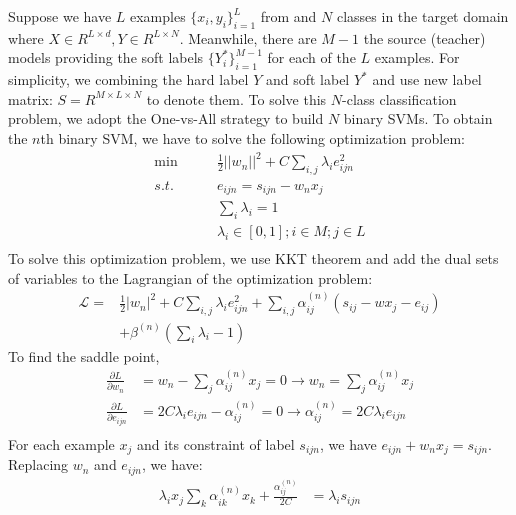 Suppose we have $L$ examples $\{x_i,y_i\}_{i=1}^L$ from and $N$ classes in the target domain where $X\in R^{L\times d}, Y\in R^{L\times N}$. Meanwhile, there are $M-1$ the source (teacher) models providing the soft labels $\{Y^*_i\}_{i=1}^{M-1}$ for each of the $L$ examples.
For simplicity, we combining the hard label $Y$ and soft label $Y^*$ and use new label matrix: $S = R^{M\times L \times N}$ to denote them. To solve this $N$-class classification problem, we adopt the One-vs-All strategy to build $N$ binary SVMs.
To obtain the $n$th binary SVM, we have to solve the following optimization problem: 
\begin{equation}\label{eq:multi-distill}
\begin{aligned}
\min \qquad & \frac{1}{2}{\left|| w_n \right||^2} + C\sum_{i,j} \lambda_i{e_{ijn}^2} \\
s.t.\qquad& e_{ijn} = s_{ijn} - w_nx_j\\
& \sum_i\lambda_i=1\\
& \lambda_i \in [0,1]; i\in M;  j\in L\\
\end{aligned}  
\end{equation}
To solve this optimization problem, we use KKT theorem \cite{cristianini2000introduction} and add the dual sets of variables to the Lagrangian of the optimization problem:
\begin{equation}
\begin{aligned}
\mathcal{L}=&\frac{1}{2}{\left| w_n \right|^2} + C\sum_{i,j} \lambda_i{e_{ijn}^2}+\sum_{i,j}\alpha^{(n)}_{ij}\left(s_{ij} - wx_j-e_{ij}\right)\\&+\beta^{(n)}\left(\sum_i\lambda_i-1\right)
\end{aligned}
\end{equation}
To find the saddle point, 
\begin{equation}
\begin{aligned}
\frac{{\partial L}}{{\partial w_n}}& = w_n - \sum_{j}\alpha^{(n)}_{ij} {x_j}=0 \rightarrow w_n = \sum_{j}\alpha^{(n)}_{ij} {x_j}\\
\frac{{\partial L}}{{\partial {e_{ijn}}}} & = 2C\lambda_i {e_{ijn}} - {\alpha^{(n)} _{ij}}=0 \rightarrow \alpha^{(n)}_{ij} = 2C\lambda_i {e_{ijn}}\\
\end{aligned}
\end{equation}
For each example $x_j$ and its constraint of label $s_{ijn}$, we have $e_{ijn}  + w_nx_j= s_{ijn}$. Replacing $w_n$ and $e_{ijn}$,  we have:  
\begin{equation}
\begin{aligned}
\lambda_ix_j\sum_{k}\alpha^{(n)}_{ik}x_k+\frac{\alpha^{(n)}_{ij}}{2C}&=\lambda_is_{ijn}
\end{aligned}
\end{equation}
